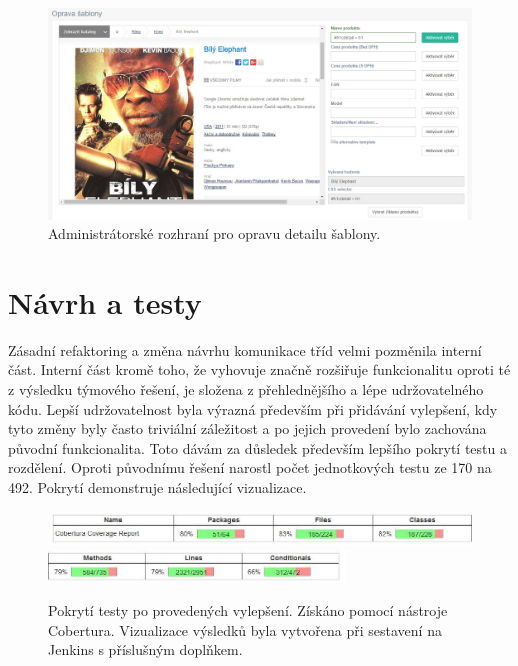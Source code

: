 \documentclass[thesis=B,czech]{FITthesis}[2012/06/26]
\begin{document}
\par
\begin{figure}[h]\centering
 	\includegraphics[width=1.0\textwidth]{resources/template-detail-err}
	\caption[Administrátorské rozhraní pro opravu detailu šablony]{Administrátorské rozhraní pro opravu detailu šablony.}\label{fig:temp-det-err}
\end{figure}



\section{Návrh a testy}

Zásadní refaktoring a změna návrhu komunikace tříd velmi pozměnila interní část. 
Interní část kromě toho, že vyhovuje značně rozšiřuje funkcionalitu oproti té z výsledku týmového řešení,
je složena z přehlednějšího a lépe udržovatelného kódu.
Lepší udržovatelnost byla výrazná především při přidávání vylepšení, kdy
tyto změny byly často triviální záležitost a po jejich provedení bylo zachována
původní funkcionalita. Toto dávám za důsledek především lepšího pokrytí
testu a rozdělení. Oproti původnímu řešení narostl počet jednotkových
testu ze 170 na 492. Pokrytí demonstruje následující vizualizace.

\begin{figure}[h]\centering
 	\includegraphics[width=1.0\textwidth]{resources/cobertura-report-new-1}
 	\includegraphics[width=0.7\textwidth]{resources/cobertura-report-new-2}
	\caption[Pokrytí testy po provedených vylepšení]{Pokrytí testy po provedených vylepšení. Získáno pomocí nástroje Cobertura. Vizualizace
	výsledků byla vytvořena při sestavení na Jenkins s příslušným doplňkem.}\label{fig:cober-new}
\end{figure}
\end{document}
